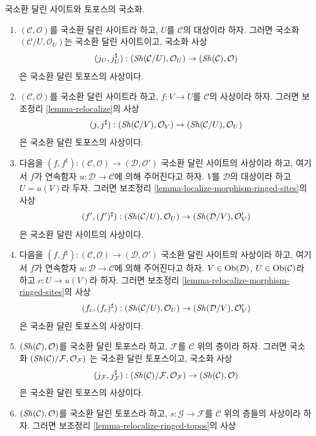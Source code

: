 \begin{lemma}
\label{lemma-localize-morphism-locally-ringed-topoi}
국소환 달린 사이트와 토포스의 국소화.
\begin{enumerate}
\item $(\mathcal{C}, \mathcal{O})$를 국소환 달린 사이트라 하고,
$U$를 $\mathcal{C}$의 대상이라 하자. 그러면 국소화
$(\mathcal{C}/U, \mathcal{O}_U)$는 국소환 달린 사이트이고, 국소화 사상
$$
(j_U, j_U^\sharp) :
(\mathop{\mathit{Sh}}\nolimits(\mathcal{C}/U), \mathcal{O}_U)
\to
(\mathop{\mathit{Sh}}\nolimits(\mathcal{C}), \mathcal{O})
$$
은 국소환 달린 토포스의 사상이다.
\item $(\mathcal{C}, \mathcal{O})$를 국소환 달린 사이트라 하고,
$f : V \to U$를 $\mathcal{C}$의 사상이라 하자. 그러면 보조정리
\ref{lemma-relocalize}의 사상
$$
(j, j^\sharp) :
(\mathop{\mathit{Sh}}\nolimits(\mathcal{C}/V), \mathcal{O}_V)
\to
(\mathop{\mathit{Sh}}\nolimits(\mathcal{C}/U), \mathcal{O}_U)
$$
은 국소환 달린 토포스의 사상이다.
\item 다음을
$(f, f^\sharp) :
(\mathcal{C}, \mathcal{O})
\longrightarrow
(\mathcal{D}, \mathcal{O}')$
국소환 달린 사이트의 사상이라 하고, 여기서 $f$가 연속함자
$u : \mathcal{D} \to \mathcal{C}$에 의해 주어진다고 하자.
$V$를 $\mathcal{D}$의 대상이라 하고 $U = u(V)$라 두자. 그러면 보조정리
\ref{lemma-localize-morphism-ringed-sites}의 사상
$$
(f', (f')^\sharp) :
(\mathop{\mathit{Sh}}\nolimits(\mathcal{C}/U), \mathcal{O}_U)
\to
(\mathop{\mathit{Sh}}\nolimits(\mathcal{D}/V), \mathcal{O}'_V)
$$
은 국소환 달린 사이트의 사상이다.
\item 다음을
$(f, f^\sharp) :
(\mathcal{C}, \mathcal{O})
\longrightarrow
(\mathcal{D}, \mathcal{O}')$
국소환 달린 사이트의 사상이라 하고, 여기서 $f$가 연속함자
$u : \mathcal{D} \to \mathcal{C}$에 의해 주어진다고 하자.
$V \in \mathop{\mathrm{Ob}}\nolimits(\mathcal{D})$, $U \in \mathop{\mathrm{Ob}}\nolimits(\mathcal{C})$라 하고
$c : U \to u(V)$라 하자. 그러면 보조정리
\ref{lemma-relocalize-morphism-ringed-sites}의 사상
$$
(f_c, (f_c)^\sharp) :
(\mathop{\mathit{Sh}}\nolimits(\mathcal{C}/U), \mathcal{O}_U)
\to
(\mathop{\mathit{Sh}}\nolimits(\mathcal{D}/V), \mathcal{O}'_V)
$$
은 국소환 달린 토포스의 사상이다.
\item $(\mathop{\mathit{Sh}}\nolimits(\mathcal{C}), \mathcal{O})$를 국소환 달린 토포스라 하고,
$\mathcal{F}$를 $\mathcal{C}$ 위의 층이라 하자. 그러면 국소화
$(\mathop{\mathit{Sh}}\nolimits(\mathcal{C})/\mathcal{F}, \mathcal{O}_\mathcal{F})$
는 국소환 달린 토포스이고, 국소화 사상
$$
(j_\mathcal{F}, j_\mathcal{F}^\sharp) :
(\mathop{\mathit{Sh}}\nolimits(\mathcal{C})/\mathcal{F}, \mathcal{O}_\mathcal{F})
\to
(\mathop{\mathit{Sh}}\nolimits(\mathcal{C}), \mathcal{O})
$$
은 국소환 달린 토포스의 사상이다.
\item $(\mathop{\mathit{Sh}}\nolimits(\mathcal{C}), \mathcal{O})$를 국소환 달린 토포스라 하고,
$s : \mathcal{G} \to \mathcal{F}$를 $\mathcal{C}$ 위의 층들의 사상이라
하자. 그러면 보조정리 \ref{lemma-relocalize-ringed-topos}의 사상

\end{enumerate}
\end{lemma}
